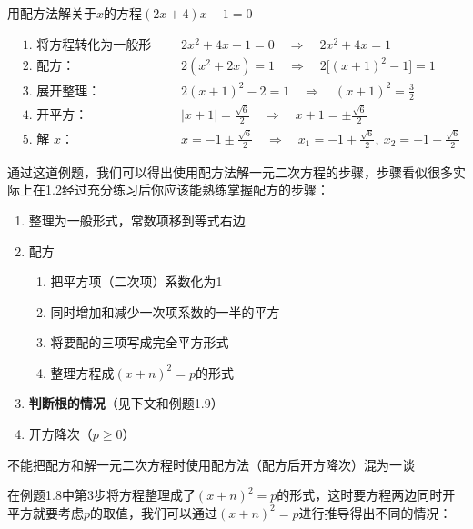 \begin{example}
    用配方法解关于\(x\)的方程\((2x+4)x - 1 = 0\)
\end{example}
\begin{solution}
\noindent
\[
\begin{aligned}
&\text{1. 将方程转化为一般形式：} && 2x^2 + 4x - 1 = 0 \quad\Rightarrow\quad 2x^2 + 4x = 1 \\[2pt]
&\text{2. 配方：} && 2\left(x^2 + 2x\right) = 1 \quad\Rightarrow\quad 2\big[(x+1)^2 - 1\big] = 1 \\[2pt]
&\text{3. 展开整理：} && 2(x+1)^2 - 2 = 1 \quad\Rightarrow\quad (x+1)^2 = \frac{3}{2} \\[2pt]
&\text{4. 开平方：} && |x+1| = \frac{\sqrt{6}}{2} \quad\Rightarrow\quad x+1 = \pm\frac{\sqrt{6}}{2} \\[2pt]
&\text{5. 解 \(x\)：} && x = -1 \pm \frac{\sqrt{6}}{2} \quad\Rightarrow\quad x_1 = -1 + \frac{\sqrt{6}}{2},\ x_2 = -1 - \frac{\sqrt{6}}{2}
\end{aligned}
\]




\end{solution}
通过这道例题，我们可以得出使用配方法解一元二次方程的步骤，步骤看似很多实际上在1.2经过充分练习后你应该能熟练掌握配方的步骤：
\begin{enumerate}
    \item 整理为一般形式，常数项移到等式右边
    \item 配方
        \begin{enumerate}
        \item 把平方项（二次项）系数化为1
        \item 同时增加和减少一次项系数的一半的平方
        \item 将要配的三项写成完全平方形式
        \item 整理方程成\((x + n)^2=p\)的形式
        \end{enumerate}
    \item \textbf{判断根的情况}（见下文和例题1.9）
    \item 开方降次（\(p\ge0\)）
\end{enumerate}
\par
\begin{remark}
    不能把配方和解一元二次方程时使用配方法（配方后开方降次）混为一谈
\end{remark}
在例题1.8中第3步将方程整理成了\((x + n)^2=p\)的形式，这时要方程两边同时开平方就要考虑\(p\)的取值，我们可以通过\((x + n)^2=p\)进行推导得出不同的情况：
